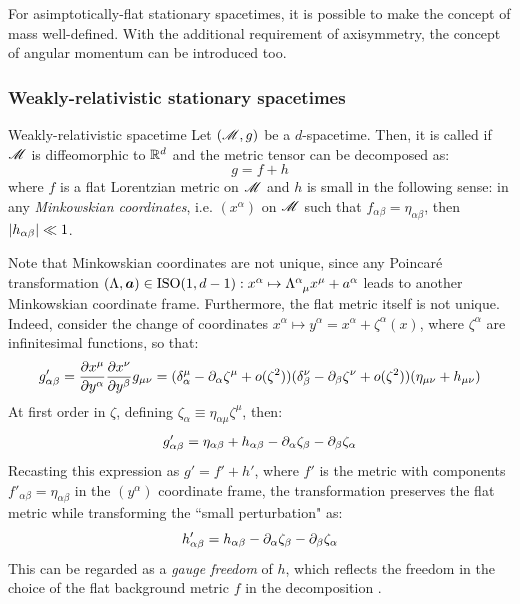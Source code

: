 For asimptotically-flat stationary spacetimes, it is possible to make the concept of mass well-defined. With the additional requirement of axisymmetry, the concept of angular momentum can be introduced too.

\subsubsection{Weakly-relativistic stationary spacetimes}

\begin{definition}{Weakly-relativistic spacetime}{}
  Let $ (\mathscr{M} , g) $ be a $ d $-spacetime. Then, it is called  if $ \mathscr{M} $ is diffeomorphic to $ \mathbb{R}^d $ and the metric tensor can be decomposed as:
  \begin{equation}
    g = f + h
    \label{eq:weak-rel-dec}
  \end{equation}
  where $ f $ is a flat Lorentzian metric on $ \mathscr{M} $ and $ h $ is small in the following sense: in any \emph{Minkowskian coordinates}, i.e. $ (x^\alpha) $ on $ \mathscr{M} $ such that $ f_{\alpha \beta} = \eta_{\alpha \beta} $, then $ \left\lvert h_{\alpha \beta}\right\rvert \ll 1 $.
\end{definition}

Note that Minkowskian coordinates are not unique, since any Poincaré transformation $ (\Lambda , \aab) \in \ISO{1,d-1} : x^\alpha \mapsto \tensor{\Lambda}{^\alpha_\mu} x^\mu + a^\alpha $ leads to another Minkowskian coordinate frame. Furthermore, the flat metric itself is not unique. Indeed, consider the change of coordinates $ x^\alpha \mapsto y^\alpha = x^\alpha + \zeta^\alpha(x) $, where $ \zeta^\alpha $ are infinitesimal functions, so that:
\begin{equation*}
  \begin{split}
    g'_{\alpha \beta} = \frac{\partial x^\mu}{\partial y^\alpha} \frac{\partial x^\nu}{\partial y^\beta} g_{\mu \nu} = (\delta^\mu_\alpha - \partial_\alpha \zeta^\mu + o(\zeta^2)) (\delta^\nu_\beta - \partial_\beta \zeta^\nu + o(\zeta^2)) (\eta_{\mu \nu} + h_{\mu \nu})
  \end{split}
\end{equation*}
At first order in $ \zeta $, defining $ \zeta_\alpha \equiv \eta_{\alpha \mu} \zeta^\mu $, then:
\begin{equation*}
  g'_{\alpha \beta} = \eta_{\alpha \beta} + h_{\alpha \beta} - \partial_\alpha \zeta_\beta - \partial_\beta \zeta_\alpha
\end{equation*}
Recasting this expression as $ g' = f' + h' $, where $ f' $ is the metric with components $ f'_{\alpha \beta} = \eta_{\alpha \beta} $ in the $ (y^\alpha) $ coordinate frame, the transformation preserves the flat metric while transforming the ``small perturbation" as:
\begin{equation}
  h'_{\alpha \beta} = h_{\alpha \beta} - \partial_\alpha \zeta_\beta - \partial_\beta \zeta_\alpha
  \label{eq:gauge-freedom}
\end{equation}
This can be regarded as a \emph{gauge freedom} of $ h $, which reflects the freedom in the choice of the flat background metric $ f $ in the decomposition .

